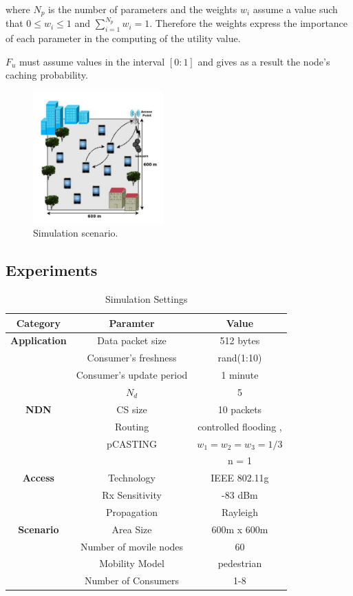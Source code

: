 \documentclass[conference]{IEEEtran}
\begin{document}
where $N_p$ is the number of parameters and the weights $w_i$ assume a value such that $0 \leq w_i \leq 1$ and $\sum_{i = 1}^{N_p} w_i = 1$.
Therefore the weights express the importance of each parameter in the computing of the utility value.

$F_u$ must assume values in the interval $[0 : 1]$ and gives as a result the node's caching probability.

\begin{figure}[htbp]
    \centerline{\includegraphics[width=5cm]{fig1.png}}
    \caption{Simulation scenario.}
    \label{fig1}
\end{figure}

\subsection{Experiments}

\begin{table}[htbp]
    \caption{Simulation Settings}
    \begin{center}
    \begin{tabular}{c|c|c|}
    \textbf{Category} & \textbf{Paramter}& \textbf{Value} \\
    \hline
    \textbf{Application} & Data packet size & 512 bytes \\
    & Consumer's freshness & rand(1:10) \\
    & Consumer's update period & 1 minute \\
    & $N_d$ & 5 \\
    \hline
    \textbf{NDN} & CS size & 10 packets \\
    & Routing & controlled flooding \cite{b6}, \cite{b15} \\
    & pCASTING & $w_1 = w_2 = w_3 = 1 / 3$ \\
    & & n = 1 \\
    \hline
    \textbf{Access} & Technology & IEEE 802.11g \\
    & Rx Sensitivity & -83 dBm \\
    & Propagation & Rayleigh \\
    \hline
    \textbf{Scenario} & Area Size & 600m x 600m \\
    & Number of movile nodes & 60 \\
    & Mobility Model & pedestrian \cite{b16} \\
    & Number of Consumers & 1-8 \\
    \end{tabular}
    \label{tab1}
    \end{center}
\end{table}
\end{document}
